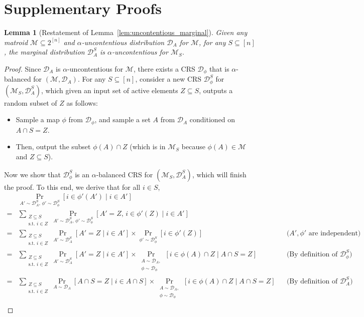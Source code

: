 \documentclass[11pt]{article}
\newcommand{\D}{\mathcal D}
\newcommand{\M}{{\mathcal M}}
\newtheorem{lemma}[theorem]{Lemma}
\begin{document}
\section{Supplementary Proofs}\label{sec:supplementary_proofs}
\begin{lemma}[Restatement of Lemma~\ref{lem:uncontentious_marginal}]
Given any matroid $\M\subseteq 2^{[n]}$ and $\alpha$-uncontentious distribution $\D_A$ for $\M$, for any $S\subseteq [n]$, the marginal distribution $\D_A^{S}$ is $\alpha$-uncontentious for $\M_{S}$.
\end{lemma}
\begin{proof}[Proof]
Since $\D_A$ is $\alpha$-uncontentious for $\M$, there exists a CRS $\D_{\phi}$ that is $\alpha$-balanced for $(\M,\D_A)$. For any $S\subseteq [n]$, consider a new CRS $\D_{\phi}^{S}$ for $(\M_S,\D_A^{S})$, which given an input set of active elements $Z\subseteq S$, outputs a random subset of $Z$ as follows:
\begin{itemize}
    \item[(1)] Sample a map $\phi$ from $\D_{\phi}$, and sample a set $A$ from $\D_A$ conditioned on $A\cap S=Z$.
    \item[(2)] Then, output the subset $\phi(A)\cap Z$ (which is in $\M_S$ because $\phi(A)\in\M$ and $Z\subseteq S$).
\end{itemize}
Now we show that $\D_{\phi}^{S}$ is an $\alpha$-balanced CRS for $(\M_S,\D_A^{S})$, which will finish the proof. To this end, we derive that for all $i\in S$,
\begin{align*}
    &\Pr_{A'\sim \D_A^S,\,\phi'\sim \D_{\phi}^S}[i\in \phi'(A')\mid i\in A']\\
    =&\sum_{\substack{Z\subseteq S\\ \textrm{s.t.~}i\in Z}}\Pr_{A'\sim \D_A^S,\,\phi'\sim \D_{\phi}^S}[A'=Z,\,i\in \phi'(Z)\mid i\in A']\\
    =&\sum_{\substack{Z\subseteq S\\ \textrm{s.t.~}i\in Z}}\Pr_{A'\sim \D_A^S}[A'=Z\mid i\in A']\times\Pr_{\phi'\sim \D_{\phi}^S}[i\in \phi'(Z)]&&\text{($A',\phi'$ are independent)}\\
    =&\sum_{\substack{Z\subseteq S\\ \textrm{s.t.~}i\in Z}}\Pr_{A'\sim \D_A^S}[A'=Z\mid i\in A']\times\Pr_{\substack{A\sim\D_{A},\\\phi\sim \D_{\phi}}}[i\in \phi(A)\cap Z\mid A\cap S=Z]&&\text{(By definition of $\D_{\phi}^S$)}\\
    =&\sum_{\substack{Z\subseteq S\\ \textrm{s.t.~}i\in Z}}\Pr_{A\sim \D_A}[A\cap S=Z\mid i\in A\cap S]\times\Pr_{\substack{A\sim\D_{A},\\\phi\sim \D_{\phi}}}[i\in \phi(A)\cap Z\mid A\cap S=Z]&&\text{(By definition of $\D_A^S$)}\\

\end{align*}
\end{proof}
\end{document}
